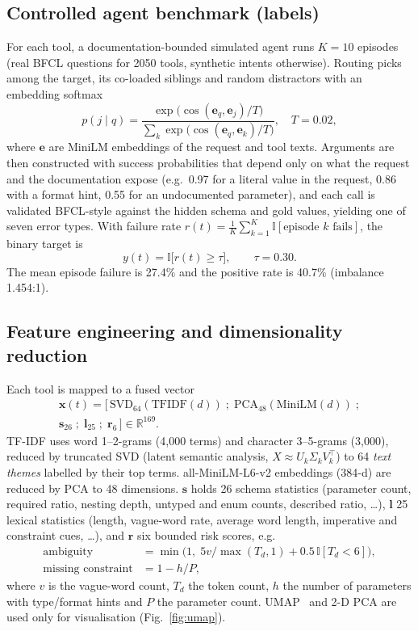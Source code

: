 \documentclass[conference]{IEEEtran}
\begin{document}
\subsection{Controlled agent benchmark (labels)}
For each tool, a documentation-bounded simulated agent runs $K=10$ episodes (real BFCL questions for 2050 tools, synthetic intents otherwise). Routing picks among the target, its co-loaded siblings and random distractors with an embedding softmax
\begin{equation}
p(j\mid q)=\frac{\exp\big(\cos(\mathbf{e}_q,\mathbf{e}_j)/T\big)}{\sum_{k}\exp\big(\cos(\mathbf{e}_q,\mathbf{e}_k)/T\big)},\quad T=0.02,
\end{equation}
where $\mathbf{e}$ are MiniLM embeddings of the request and tool texts. Arguments are then constructed with success probabilities that depend only on what the request and the documentation expose (e.g.\ 0.97 for a literal value in the request, 0.86 with a format hint, 0.55 for an undocumented parameter), and each call is validated BFCL-style against the hidden schema and gold values, yielding one of seven error types. With failure rate $r(t)=\frac1K\sum_{k=1}^{K}\mathbb{I}[\text{episode }k\text{ fails}]$, the binary target is
\begin{equation}
y(t)=\mathbb{I}\big[r(t)\ge\tau\big],\qquad \tau=0.30 .
\end{equation}
The mean episode failure is 27.4\% and the positive rate is 40.7\% (imbalance 1.454:1).

\subsection{Feature engineering and dimensionality reduction}
Each tool is mapped to a fused vector
\begin{multline}
\mathbf{x}(t)=\big[\,\mathrm{SVD}_{64}(\mathrm{TFIDF}(d))\;;\;\mathrm{PCA}_{48}(\mathrm{MiniLM}(d))\;;\\
\mathbf{s}_{26}\;;\;\mathbf{l}_{25}\;;\;\mathbf{r}_{6}\,\big]\in\mathbb{R}^{169}.
\end{multline}
TF-IDF uses word 1--2-grams (4{,}000 terms) and character 3--5-grams (3{,}000), reduced by truncated SVD (latent semantic analysis, $X\approx U_k\Sigma_kV_k^{\top}$) to 64 \emph{text themes} labelled by their top terms. all-MiniLM-L6-v2 embeddings (384-d) are reduced by PCA to 48 dimensions. $\mathbf{s}$ holds 26 schema statistics (parameter count, required ratio, nesting depth, untyped and enum counts, described ratio, \ldots), $\mathbf{l}$ 25 lexical statistics (length, vague-word rate, average word length, imperative and constraint cues, \ldots), and $\mathbf{r}$ six bounded risk scores, e.g.
\begin{align}
\text{ambiguity}&=\min\!\big(1,\;5v/\max(T_d,1)+0.5\,\mathbb{I}[T_d<6]\big),\\
\text{missing constraint}&=1-h/P,
\end{align}
where $v$ is the vague-word count, $T_d$ the token count, $h$ the number of parameters with type/format hints and $P$ the parameter count. UMAP~\cite{umap} and 2-D PCA are used only for visualisation (Fig.~\ref{fig:umap}).
\end{document}
